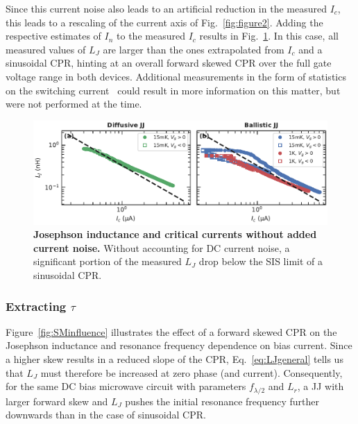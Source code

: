 Since this current noise also leads to an artificial reduction in the measured $I_c$, this leads to a rescaling of the current axis of Fig.~\ref{fig:figure2}.
%
Adding the respective estimates of $I_n$ to the measured $I_c$ results in Fig.~\ref{fig:SMfigure2}.
%
In this case, all measured values of $L_J$ are larger than the ones extrapolated from $I_c$ and a sinusoidal CPR, hinting at an overall forward skewed CPR over the full gate voltage range in both devices.
%
Additional measurements in the form of statistics on the switching current~\cite{kiviojaWeakCouplingJosephson2005a,coskunDistributionSupercurrentSwitching2012,leeProximityCouplingSuperconductorgraphene2018a} could result in more information on this matter, but were not performed at the time.

\begin{figure}
	\centering
	\includegraphics[width=\linewidth]{chapter-gJJ-CPR/figs/Figure2}
	\caption{
		\textbf{Josephson inductance and critical currents without added current noise.}
		Without accounting for DC current noise, a significant portion of the measured $L_J$ drop below the SIS limit of a sinusoidal CPR.
	}
	\label{fig:SMfigure2}
\end{figure}





\subsubsection{Extracting $\tau$}

Figure~\ref{fig:SMinfluence} illustrates the effect of a forward skewed CPR on the Josephson inductance and resonance frequency dependence on bias current.
%
Since a higher skew results in a reduced slope of the CPR, Eq.~\ref{eq:LJgeneral} tells us that $L_J$ must therefore be increased at zero phase (and current).
%
Consequently, for the same DC bias microwave circuit with parameters $f_{\lambda/2}$ and $L_r$, a JJ with larger forward skew and $L_J$ pushes the initial resonance frequency further downwards than in the case of sinusoidal CPR.

